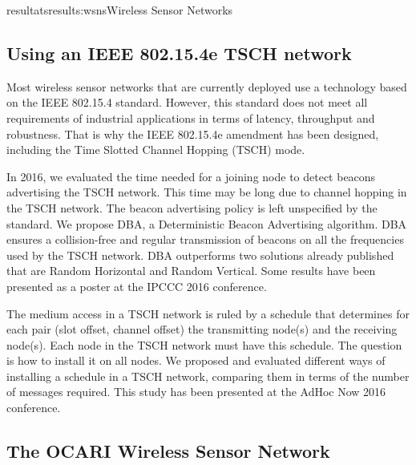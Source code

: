 \documentclass{ra2016}
\begin{document}
\begin{module}{resultats}{results:wsns}{Wireless Sensor Networks}
\subsection{Using an IEEE 802.15.4e TSCH network}

 \begin{participants}
\end{participants}  

Most wireless sensor networks that are currently deployed use a technology based on the IEEE 802.15.4 standard. However, this standard does not meet all requirements of industrial applications in terms of latency, throughput and robustness. That is why the IEEE 802.15.4e amendment has been designed, including the Time Slotted Channel Hopping (TSCH) mode.

In 2016, we evaluated the time needed for a joining node to detect beacons advertising the TSCH network. This time may be long due to channel hopping in the TSCH network. The beacon advertising policy is left unspecified by the standard. We propose DBA, a Deterministic Beacon Advertising algorithm. DBA ensures a collision-free and regular transmission of beacons on all the frequencies used by the TSCH network. DBA outperforms two solutions already published that are Random Horizontal and Random Vertical. Some results have been presented as a poster at the IPCCC 2016 conference.

The medium access in a TSCH network is ruled by a schedule that determines for each pair (slot offset, channel offset) the transmitting node(s) and the receiving node(s). Each node in the TSCH network must have this schedule. The question is how to install it on all nodes. We proposed and evaluated different ways of installing a schedule in a TSCH network, comparing them in terms of the number of messages required. This study has been presented at the AdHoc Now 2016 conference.

\subsection{The OCARI Wireless Sensor Network}

\begin{participants}
\end{participants}  


\end{module}
\end{document}
